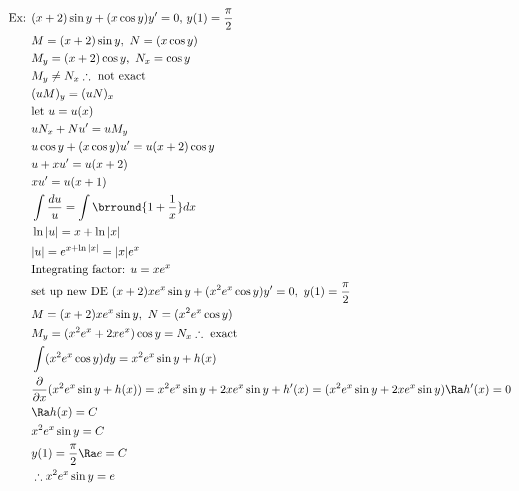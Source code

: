 \begin{align*}
    \text{Ex: }&(x+2)\sin y+(x\cos y)y'=0,\,y(1)=\frac{\pi}{2}\\
    &M=(x+2)\sin y,\ N=(x\cos y)\\
    &M_y=(x+2)\cos y,\ N_x=\cos y\\
    &M_y\neq N_x\therefore \text{ not exact}\\
    &(uM)_y=(uN)_x\\
    &\text{let }u=u(x)\\
    &uN_x+Nu'=uM_y\\
    &u\cos y+(x\cos y)u'=u(x+2)\cos y\\
    &u+xu'=u(x+2)\\
    &xu'=u(x+1)\\
    &\int\frac{du}{u}=\int\brround{1+\frac{1}{x}}dx\\
    &\ln|u|=x+\ln|x|\\
    &|u|=e^{x+\ln|x|}=|x|e^x\\
    &\text{Integrating factor: }u=xe^x\\
    &\text{set up new DE }(x+2)xe^x\sin y+(x^2e^x\cos y)y'=0,\ y(1)=\frac{\pi}{2}\\
    &M=(x+2)xe^x\sin y,\ N=(x^2e^x\cos y)\\
    &M_y=(x^2e^x+2xe^x)\cos y=N_x\therefore \text{ exact}\\
    &\int(x^2e^x\cos y)dy=x^2e^x\sin y+h(x)\\
    &\frac{\partial}{\partial x}(x^2e^x\sin y+h(x))=x^2e^x\sin y+2xe^x\sin y+h'(x)=(x^2e^x\sin y+2xe^x\sin y)\Ra h'(x)=0\\
    &\Ra h(x)=C\\
    &x^2e^x\sin y=C\\
    &y(1)=\frac{\pi}{2}\Ra e=C\\
    &\therefore x^2e^x\sin y=e
\end{align*}
